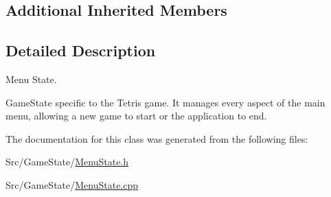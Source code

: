\subsection*{Additional Inherited Members}


\subsection{Detailed Description}
Menu State. 

Game\-State specific to the Tetris game. It manages every aspect of the main menu, allowing a new game to start or the application to end. 

The documentation for this class was generated from the following files\-:\begin{DoxyCompactItemize}
\item 
Src/\-Game\-State/\hyperlink{MenuState_8h}{Menu\-State.\-h}\item 
Src/\-Game\-State/\hyperlink{MenuState_8cpp}{Menu\-State.\-cpp}\end{DoxyCompactItemize}
